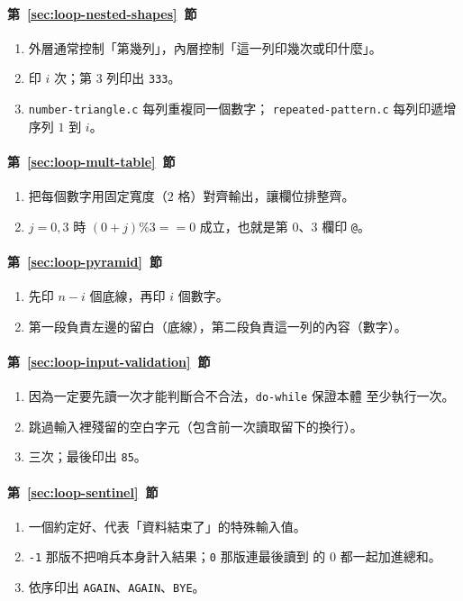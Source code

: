 \paragraph{第~\ref{sec:loop-nested-shapes}~節}
\begin{enumerate}
\item 外層通常控制「第幾列」，內層控制「這一列印幾次或印什麼」。
\item 印 $i$ 次；第 $3$ 列印出 \texttt{333}。
\item \texttt{number-triangle.c} 每列重複同一個數字；
\texttt{repeated-pattern.c} 每列印遞增序列 $1$ 到 $i$。
\end{enumerate}

\paragraph{第~\ref{sec:loop-mult-table}~節}
\begin{enumerate}
\item 把每個數字用固定寬度（$2$ 格）對齊輸出，讓欄位排整齊。
\item $j = 0, 3$ 時 $(0+j) \% 3 == 0$ 成立，也就是第 $0$、$3$ 欄印
\texttt{@}。
\end{enumerate}

\paragraph{第~\ref{sec:loop-pyramid}~節}
\begin{enumerate}
\item 先印 $n - i$ 個底線，再印 $i$ 個數字。
\item 第一段負責左邊的留白（底線），第二段負責這一列的內容（數字）。
\end{enumerate}

\paragraph{第~\ref{sec:loop-input-validation}~節}
\begin{enumerate}
\item 因為一定要先讀一次才能判斷合不合法，\texttt{do-while} 保證本體
至少執行一次。
\item 跳過輸入裡殘留的空白字元（包含前一次讀取留下的換行）。
\item 三次；最後印出 \texttt{85}。
\end{enumerate}

\paragraph{第~\ref{sec:loop-sentinel}~節}
\begin{enumerate}
\item 一個約定好、代表「資料結束了」的特殊輸入值。
\item \texttt{-1} 那版不把哨兵本身計入結果；\texttt{0} 那版連最後讀到
的 $0$ 都一起加進總和。
\item 依序印出 \texttt{AGAIN}、\texttt{AGAIN}、\texttt{BYE}。
\end{enumerate}

